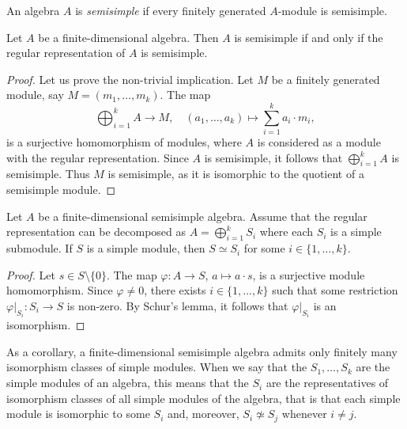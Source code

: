 \begin{definition}
    An algebra $A$ is \emph{semisimple} if every finitely generated $A$-module is semisimple. 
\end{definition}

\begin{proposition}
Let $A$ be a finite-dimensional algebra. Then $A$ is semisimple if and only if 
the regular representation of $A$ is semisimple. 
\end{proposition}

\begin{proof}
Let us prove the non-trivial implication. Let $M$ be a finitely generated module, say $M=(m_1,\dots,m_k)$. 
The map
\[
\bigoplus_{i=1}^k A\to M,\quad
(a_1,\dots,a_k)\mapsto \sum_{i=1}^k a_i\cdot m_i,
\]
is a surjective homomorphism of modules, where $A$ is considered as a module with the regular
representation. Since 
$A$ is semisimple, it follows that $\bigoplus_{i=1}^kA$ is semisimple. 
Thus $M$ is semisimple, as it is isomorphic to the quotient of a semisimple module.
\end{proof}

\begin{theorem}
Let $A$ be a finite-dimensional semisimple algebra. 
Assume that the regular representation can be decomposed as $A=\bigoplus_{i=1}^k S_i$ where each $S_i$ is a simple submodule.  
If $S$ is a simple module, then $S\simeq S_i$ for some $i\in\{1,\dots,k\}$. 
\end{theorem}

\begin{proof}
Let $s\in S\setminus\{0\}$. The map $\varphi\colon A\to S$, $a\mapsto a\cdot s$, is a surjective module homomorphism. Since 
$\varphi\ne 0$, there exists $i\in\{1,\dots,k\}$ such that some restriction 
$\varphi|_{S_i}\colon S_i\to S$ is non-zero. By Schur's lemma, it follows that  
$\varphi|_{S_i}$ is an isomorphism.   	
\end{proof}

As a corollary, a finite-dimensional semisimple algebra admits 
only finitely many isomorphism classes of simple modules. When we say that 
the $S_1,\dots,S_k$ are the simple modules of an algebra, this means that the $S_i$ are the representatives
of isomorphism classes of all simple modules of the algebra, that is that each simple module is isomorphic to
some $S_i$ and, moreover,  
$S_i\not\simeq S_j$ whenever $i\ne j$. 

